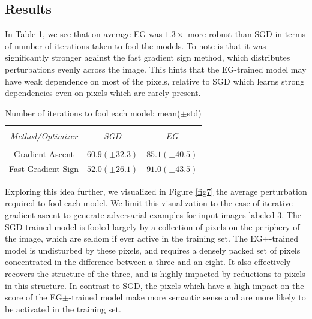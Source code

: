 \documentclass{asaproc}
\begin{document}
\subsection*{Results}

In Table \ref{tab2}, we see that on average EG was $1.3\times$ more robust than SGD in terms of number of iterations taken to fool the models. To note is that it was significantly stronger against the fast gradient sign method, which distributes perturbations evenly across the image. This hints that the EG-trained model may have weak dependence on most of the pixels, relative to SGD which learns strong dependencies even on pixels which are rarely present.

\begin{table}
	\caption{\enspace Number of iterations to fool each model: mean($\pm$std)}
	\label{tab2}
	\begin{tabular*}{\hsize}{@{\extracolsep{\fill}}ccc}
		\hline
		\\[-7pt]
		\multicolumn{1}{c}{\it Method/Optimizer} & 
		\multicolumn{1}{c}{\it SGD}              & 
		\multicolumn{1}{c}{\it EG}               \\ 
		\hline
		\\[-5pt] 
		Gradient Ascent    & $60.9 (\pm 32.3)$ & $85.1 (\pm 40.5)$ \\ 
		Fast Gradient Sign & $52.0 (\pm 26.1)$ & $91.0 (\pm 43.5)$
	\end{tabular*}
\end{table}

Exploring this idea further, we visualized in Figure \ref{fig7} the average perturbation required to fool each model. We limit this visualization to the case of iterative gradient ascent to generate adversarial examples for input images labeled 3. The SGD-trained model is fooled largely by a collection of pixels on the periphery of the image, which are seldom if ever active in the training set. The EG$\pm$-trained model is undisturbed by these pixels, and requires a densely packed set of pixels concentrated in the difference between a three and an eight. It also effectively recovers the structure of the three, and is highly impacted by reductions to pixels in this structure. In contrast to SGD, the pixels which have a high impact on the score of the EG$\pm$-trained model make more semantic sense and are more likely to be activated in the training set.
\end{document}
